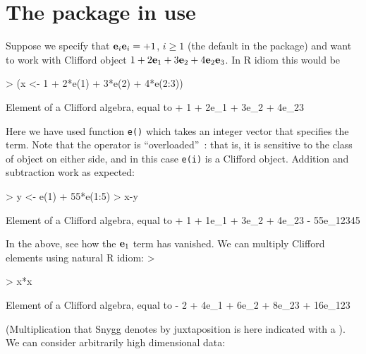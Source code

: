 \documentclass{birkjour}
\theoremstyle{definition}
\theoremstyle{remark}
\numberwithin{equation}{section}
\begin{document}
\section{The package in use}

Suppose we specify that ${\bf e}_{i}{\bf e}_{i}=+1$,
  $i\geqslant 1$ (the default in the package) and want to work with
Clifford object $1+2{\bf e}_{1}+3{\bf e}_{2}+4{\bf e}_{2}{\bf e}_{3}$.  In R idiom this
would be

\begin{Schunk}
\begin{Sinput}
> (x <- 1 + 2*e(1) + 3*e(2) + 4*e(2:3))
\end{Sinput}
\begin{Soutput}
Element of a Clifford algebra, equal to
+ 1 + 2e_1 + 3e_2 + 4e_23
\end{Soutput}
\end{Schunk}

Here we have used function {\tt e()} which takes an integer vector
that specifies the term.  Note that the {\tt *}
  operator is ``overloaded''~\cite{stroustrup2013}: that is, it is
  sensitive to the class of object on either side, and in this case
  {\tt e(i)} is a Clifford object.  Addition and subtraction work as
expected:

\begin{Schunk}
\begin{Sinput}
> y <- e(1) + 55*e(1:5)
> x-y
\end{Sinput}
\begin{Soutput}
Element of a Clifford algebra, equal to
+ 1 + 1e_1 + 3e_2 + 4e_23 - 55e_12345
\end{Soutput}
\end{Schunk}

In the above, see how the ${\bf e}_{1}$ term has vanished.  We can
multiply Clifford elements using natural R idiom:
>
\begin{Schunk}
\begin{Sinput}
> x*x
\end{Sinput}
\begin{Soutput}
Element of a Clifford algebra, equal to
- 2 + 4e_1 + 6e_2 + 8e_23 + 16e_123
\end{Soutput}
\end{Schunk}

(Multiplication that Snygg denotes by juxtaposition is here indicated
with a {\tt *}).  We can consider arbitrarily high dimensional data:
\end{document}
